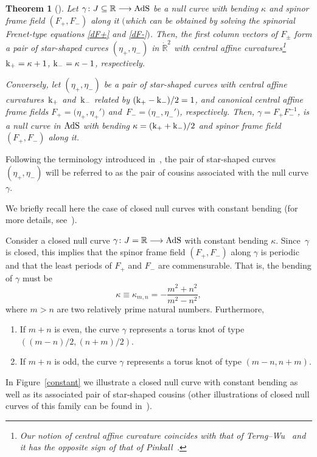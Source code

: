 \documentclass[10pt,a4paper]{amsart}
\numberwithin{equation}{section}
\newtheorem{Theorem}{Theorem}[section]
\def\bending{\kappa}
\def\R{\mathbb{R}}
\def\curvature{{\rm k}}
\def\AdS{{\rm AdS}}
\begin{document}
\begin{Theorem}[{\cite[Theorem 3.3]{MP}}]\label{relation} Let $\gamma\colon J\subseteq\R\longrightarrow\AdS$ be a null curve with bending $\bending$ and spinor frame field $(F_+,F_-)$ along it $($which can be obtained by solving the spinorial Frenet-type equations \eqref{dF+} and \eqref{dF-}$)$. Then, the first column vectors of $F_\pm$ form a pair of star-shaped curves ${(\eta_+,\eta_-)}$ in $\dot{\R}^2$ with central affine curvatures\footnote{Our notion of central affine curvature coincides with that of Terng--Wu~\cite{TW1} and it has the opposite sign of that of Pinkall~\cite{P}.}
$\curvature_+=\bending+1$, $\curvature_-=\bending-1$, respectively.
	
	Conversely, let $(\eta_+,\eta_-)$ be a pair of star-shaped curves with central affine curvatures~$\curvature_+$ and~$\curvature_-$ related by $(\curvature_+-\curvature_-)/2=1$, and canonical central affine frame fields $F_+=\bigl(\eta_+,\eta_+'\bigr)$ and~${F_-=\bigl(\eta_-,\eta_-'\bigr)}$, respectively. Then, $\gamma=F_+F_-^{-1}$,
	is a null curve in $\AdS$ with bending $\bending=(\curvature_++\curvature_-)/2$ and spinor frame field $(F_+,F_-)$ along it.
\end{Theorem}

\begin{Remark} Following the terminology introduced in~\cite{MP}, the pair of star-shaped curves ${(\eta_+,\eta_-)}$ will be referred to as the pair of cousins associated with the null curve $\gamma$.
\end{Remark}

We briefly recall here the case of closed null curves with constant bending (for more details, see~\cite[Example 3.5]{MP}).

\begin{Example}\label{example} Consider a closed null curve $\gamma\colon J=\R\longrightarrow\AdS$ with constant bending $\bending$. Since~$\gamma$ is closed, this implies that the spinor frame field $(F_+,F_-)$ along $\gamma$ is periodic and that the least periods of $F_+$ and $F_-$ are commensurable. That is, the bending of $\gamma$ must be
	\begin{equation*}\bending\equiv\bending_{m,n}=-\frac{m^2+n^2}{m^2-n^2},\end{equation*}
	where $m>n$ are two relatively prime natural numbers. Furthermore,
	\begin{enumerate}\itemsep=0pt
		\item If $m+n$ is even, the curve $\gamma$ represents a torus knot of type $((m-n)/2,(n+m)/2)$.
		\item If $m+n$ is odd, the curve $\gamma$ represents a torus knot of type $(m-n,n+m)$.
	\end{enumerate}
	In Figure~\ref{constant} we illustrate a closed null curve with constant bending as well as its associated pair of star-shaped cousins (other illustrations of closed null curves of this family can be found in~\mbox{\cite[Figures~2 and~3]{MP}}).
\end{Example}
\end{document}
